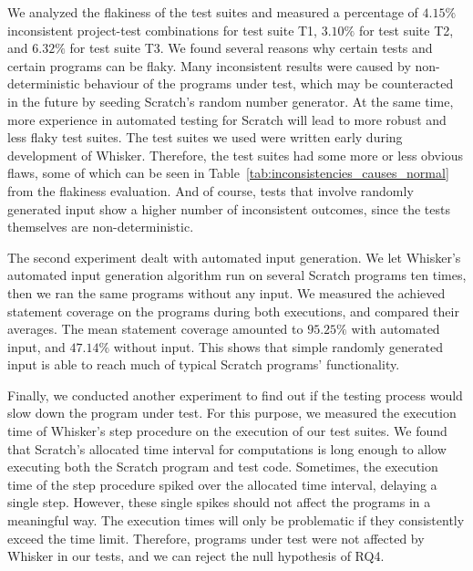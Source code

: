 We analyzed the flakiness of the test suites and measured a percentage of $4.15\%$ inconsistent project-test combinations for test suite T1,
$3.10\%$ for test suite T2, and $6.32\%$ for test suite T3.
We found several reasons why certain tests and certain programs can be flaky.
Many inconsistent results were caused by non-deterministic behaviour of the programs under test,
which may be counteracted in the future by seeding Scratch's random number generator.
At the same time, more experience in automated testing for Scratch will lead to more robust and less flaky test suites.
The test suites we used were written early during development of Whisker.
Therefore, the test suites had some more or less obvious flaws,
some of which can be seen in Table~\ref{tab:inconsistencies_causes_normal} from the flakiness evaluation.
And of course, tests that involve randomly generated input show a higher number of inconsistent outcomes,
since the tests themselves are non-deterministic.
\parspace

The second experiment dealt with automated input generation.
We let Whisker's automated input generation algorithm run on several Scratch programs ten times,
then we ran the same programs without any input.
We measured the achieved statement coverage on the programs during both executions,
and compared their averages.
The mean statement coverage amounted to $95.25\%$ with automated input, and $47.14\%$ without input.
This shows that simple randomly generated input is able to reach much of typical Scratch programs' functionality.
\parspace

Finally, we conducted another experiment to find out
if the testing process would slow down the program under test.
For this purpose, we measured the execution time of Whisker's step procedure on the execution of our test suites.
We found that Scratch's allocated time interval for computations is long enough to
allow executing both the Scratch program and test code.
Sometimes, the execution time of the step procedure spiked over the allocated time interval,
delaying a single step.
However, these single spikes should not affect the programs in a meaningful way.
The execution times will only be problematic if they consistently exceed the time limit.
Therefore, programs under test were not affected by Whisker in our tests, and we can reject the null hypothesis of RQ4.


